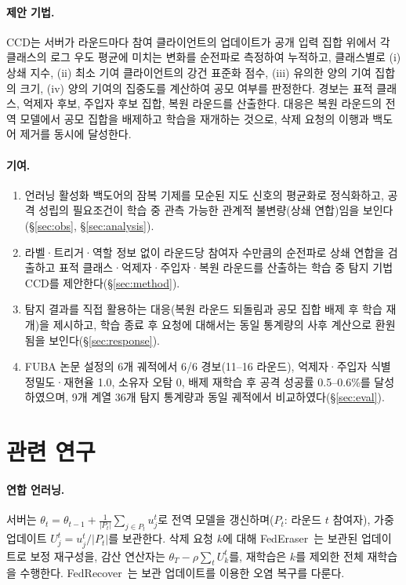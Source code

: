 \documentclass[10pt,a4paper]{article}
\newcommand{\method}{CCD}
\begin{document}
\paragraph{제안 기법.}
\method{}는 서버가 라운드마다 참여 클라이언트의 업데이트가 공개 입력 집합 위에서 각 클래스의 로그 우도 평균에 미치는 변화를 순전파로 측정하여 누적하고, 클래스별로 (i) 상쇄 지수, (ii) 최소 기여 클라이언트의 강건 표준화 점수, (iii) 유의한 양의 기여 집합의 크기, (iv) 양의 기여의 집중도를 계산하여 공모 여부를 판정한다. 경보는 표적 클래스, 억제자 후보, 주입자 후보 집합, 복원 라운드를 산출한다. 대응은 복원 라운드의 전역 모델에서 공모 집합을 배제하고 학습을 재개하는 것으로, 삭제 요청의 이행과 백도어 제거를 동시에 달성한다.

\paragraph{기여.}
\begin{enumerate}
\item 언러닝 활성화 백도어의 잠복 기제를 모순된 지도 신호의 평균화로 정식화하고, 공격 성립의 필요조건이 학습 중 관측 가능한 관계적 불변량(상쇄 연합)임을 보인다(\S\ref{sec:obs}, \S\ref{sec:analysis}).
\item 라벨·트리거·역할 정보 없이 라운드당 참여자 수만큼의 순전파로 상쇄 연합을 검출하고 표적 클래스·억제자·주입자·복원 라운드를 산출하는 학습 중 탐지 기법 \method{}를 제안한다(\S\ref{sec:method}).
\item 탐지 결과를 직접 활용하는 대응(복원 라운드 되돌림과 공모 집합 배제 후 학습 재개)을 제시하고, 학습 종료 후 요청에 대해서는 동일 통계량의 사후 계산으로 환원됨을 보인다(\S\ref{sec:response}).
\item FUBA 논문 설정의 6개 궤적에서 6/6 경보(11--16 라운드), 억제자·주입자 식별 정밀도·재현율 1.0, 소유자 오탐 0, 배제 재학습 후 공격 성공률 0.5--0.6\%를 달성하였으며, 9개 계열 36개 탐지 통계량과 동일 궤적에서 비교하였다(\S\ref{sec:eval}).
\end{enumerate}

\section{관련 연구}
\paragraph{연합 언러닝.} 서버는 $\theta_t=\theta_{t-1}+\frac{1}{|P_t|}\sum_{j\in P_t}u_j^t$로 전역 모델을 갱신하며($P_t$: 라운드 $t$ 참여자), 가중 업데이트 $U_j^t=u_j^t/|P_t|$를 보관한다. 삭제 요청 $k$에 대해 FedEraser~\cite{federaser}는 보관된 업데이트로 보정 재구성을, 감산 연산자는 $\theta_T-\rho\sum_tU_k^t$를, 재학습은 $k$를 제외한 전체 재학습을 수행한다. FedRecover~\cite{fedrecover}는 보관 업데이트를 이용한 오염 복구를 다룬다.
\end{document}
